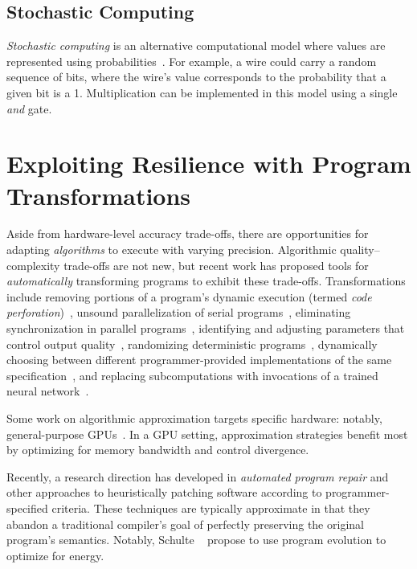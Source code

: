 \subsection{Stochastic Computing}

\emph{Stochastic computing} is an alternative computational model where values
are represented using probabilities~\cite{pcmos, pcmos-cacm,
palem-dac-position, stochasticproc, storm, lyric, mansinghka-circuits}.
For example, a wire could carry a random sequence of bits, where the wire's
value corresponds
to the probability that a given bit is a 1.
Multiplication can be implemented in this model using a single \emph{and}
gate.


\section{Exploiting Resilience with Program Transformations}
\label{sec:related:software}

Aside from hardware-level accuracy trade-offs, there are opportunities for
adapting \emph{algorithms} to execute with varying precision. Algorithmic
quality--complexity trade-offs are not new, but recent work has
proposed
tools for \emph{automatically} transforming programs to exhibit these
trade-offs.
Transformations include removing portions of a program's dynamic execution
(termed \emph{code perforation})~\cite{perforation}, unsound
parallelization of serial programs~\cite{quickstep}, eliminating
synchronization in parallel programs~\cite{dubstep, races-ibm, hogwild,
forgiving-parallel},
identifying and adjusting parameters that control output
quality~\cite{dynamicknobs}, randomizing deterministic
programs~\cite{zhu-popl12, sasa-sas11}, dynamically choosing between
different programmer-provided implementations of the same
specification~\cite{green, virus, petabricks, taco-soc, ansel-autotuning,
scalable-classifier}, and replacing subcomputations with invocations
of a trained neural network~\cite{npu}.

Some work on algorithmic approximation targets specific hardware: notably,
general-purpose GPUs~\cite{paraprox, sage, herding, neuralgpu}.
In a GPU setting, approximation strategies benefit most by optimizing for
memory bandwidth and control divergence.

Recently, a research direction has developed in \emph{automated program
repair} and other approaches to heuristically patching software according to
programmer-specified criteria.
These techniques are typically approximate in that they abandon a traditional
compiler's goal of perfectly preserving the original program's semantics.
Notably, Schulte \etal~\cite{schulte} propose to use program evolution to
optimize for energy.

